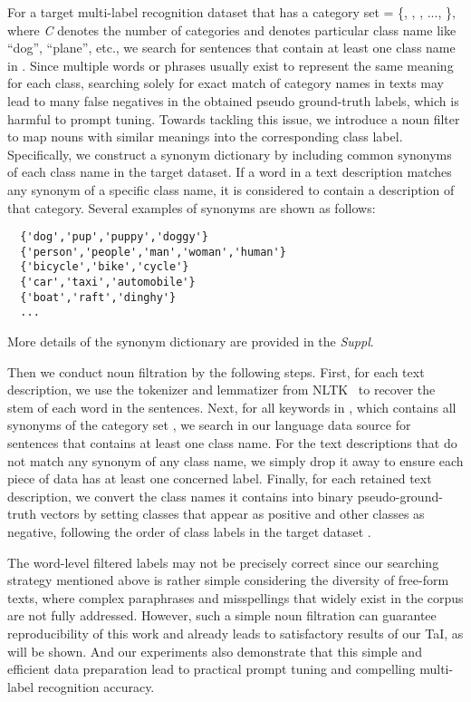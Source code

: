 \documentclass[10pt,twocolumn,letterpaper]{article}
\begin{document}
For a target multi-label recognition dataset  that has a category set  = \{, , , ..., \}, where \textit{C} denotes the number of categories and  denotes particular class name like ``dog'', ``plane'', etc., we search for sentences that contain at least one class name  in . 
Since multiple words or phrases usually exist to represent the same meaning for each class, searching solely for exact match of category names in texts may lead to many false negatives in the obtained pseudo ground-truth labels, which is harmful to prompt tuning.
Towards tackling this issue, we introduce a noun filter to map nouns with similar meanings into the corresponding class label. Specifically, we construct a synonym dictionary  by including common synonyms of each class name in the target dataset. 
If a word in a text description matches any synonym of a specific class name, it is considered to contain a description of that category. Several examples of synonyms are shown as follows:
{\small\begin{verbatim}
  {'dog','pup','puppy','doggy'}
  {'person','people','man','woman','human'}
  {'bicycle','bike','cycle'}
  {'car','taxi','automobile'}
  {'boat','raft','dinghy'}
  ...
\end{verbatim}}
\noindent More details of the synonym dictionary  are provided in the \emph{Suppl}.

Then we conduct noun filtration by the following steps. First, for each text description, we use the tokenizer and lemmatizer from NLTK~\cite{bird2009natural} to recover the stem of each word in the sentences. Next, for all keywords in , which contains all synonyms of the category set , we search in our language data source for sentences that contains at least one class name. For the text descriptions that do not match any synonym of any class name, we simply drop it away to ensure each piece of data has at least one concerned label. Finally, for each retained text description, we convert the class names it contains into binary pseudo-ground-truth vectors by setting classes that appear as positive and other classes as negative, following the order of class labels in the target dataset .

The word-level filtered labels may not be precisely correct since our searching strategy mentioned above is rather simple considering the diversity of free-form texts, where complex paraphrases and misspellings that widely exist in the corpus are not fully addressed. 
However, such a simple noun filtration can guarantee reproducibility of this work and already leads to satisfactory results of our TaI, as will be shown.
And our experiments also demonstrate that this simple and efficient data preparation lead to practical prompt tuning and compelling multi-label recognition accuracy.
\end{document}

